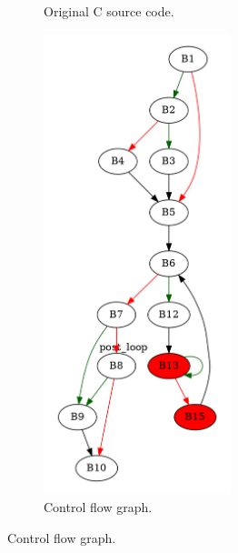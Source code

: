 \begin{figure}[htbp]
	\centering
	\begin{subfigure}[b]{0.30\textwidth}
		\centering
		
		\caption{Original C source code.}
	\end{subfigure}
	\begin{subfigure}[b]{0.50\textwidth}
		\centering
		\includegraphics[width=0.6\textwidth]{inc/appendices/examples/hammock/counter-example/jump-threading-and-short-circuit/jump-threading-and-short-circuit_jump/f_0001a.png}
		\caption{Control flow graph.}
	\end{subfigure}
\end{figure}

